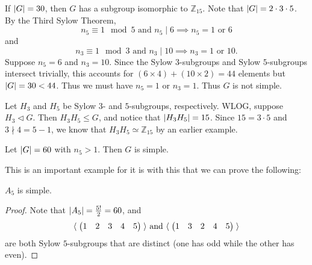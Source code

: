 \documentclass[notoc,notitlepage]{tufte-book}
\begin{document}
\begin{eg}
  If $\left| G \right| = 30$, then $G$ has a subgroup isomorphic to $\mathbb{Z}_{15}$.
  Note that $\left| G \right| = 2 \cdot 3 \cdot 5$. By the Third Sylow Theorem,
  \begin{equation*}
    n_5 \equiv 1 \mod 5 \text{ and } n_5 \mid 6 \implies n_5 = 1 \text{ or } 6
  \end{equation*}
  and
  \begin{equation*}
    n_3 \equiv 1 \mod 3 \text{ and } n_3 \mid 10 \implies n_3 = 1 \text{ or } 10.
  \end{equation*}
  Suppose $n_5 = 6$ and $n_3 = 10$. Since the Sylow $3$-subgroups and Sylow 
  $5$-subgroups intersect trivially, this accounts for 
  $(6 \times 4) + ( 10 \times 2 ) = 44$ elements but $\left|G\right| = 30 < 44$.
  Thus we must have $n_5 = 1$ or $n_3 = 1$. Thus $G$ is not simple.

  Let $H_3$ and $H_5$ be Sylow $3$- and $5$-subgroups, respectively. WLOG, suppose
  $H_3 \triangleleft G$. Then $H_3 H_5 \leq G$, and notice that $\left|H_3 H_5\right| = 15$.
  Since $15 = 3 \cdot 5$ and $3 \nmid 4 = 5 - 1$, we know that $H_3 H_5 \simeq \mathbb{Z}_{15}$
  by an earlier example.
\end{eg}

\begin{eg}\label{eg:g_60_is_simple}
  Let $\left| G \right| = 60$ with $n_5 > 1$. Then $G$ is simple.
\end{eg}

This is an important example for it is with this that we can prove the following:

\begin{crly}[$A_5$ is Simple]\label{crly:_a_5_is_simple}
  $A_5$ is simple.
\end{crly}

\begin{proof}
  Note that $\left| A_5 \right| = \frac{5!}{2} = 60$, and
  \begin{equation*}
    \langle \; \begin{pmatrix} 1 & 2 & 3 & 4 & 5 \end{pmatrix} \; \rangle 
    \text{ and } \langle \; \begin{pmatrix} 1 & 3 & 2 & 4 & 5 \end{pmatrix} \; \rangle
  \end{equation*}
  are both Sylow $5$-subgroups that are distinct (one has odd  while the
  other has even).
\end{proof}
\end{document}

